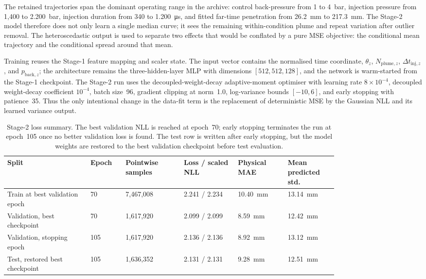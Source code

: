 \documentclass[english, 12pt, a4paper, elec, utf8, a-2b, online]{aaltothesis}
\begin{document}
The retained trajectories span the dominant operating range in the archive: control back-pressure from 1 to \SI{4}{bar}, injection pressure from 1,400 to \SI{2,200}{bar}, injection duration from 340 to \SI{1,200}{\micro s}, and fitted far-time penetration from \SI{26.2}{mm} to \SI{217.3}{mm}. The Stage-2 model therefore does not only learn a single median curve; it sees the remaining within-condition plume and repeat variation after outlier removal. The heteroscedastic output is used to separate two effects that would be conflated by a pure MSE objective: the conditional mean trajectory and the conditional spread around that mean.

Training reuses the Stage-1 feature mapping and scaler state. The input vector contains the normalised time coordinate, \(\theta_z\), \(N_{\mathrm{plume},z}\), \(\Delta t_{\mathrm{inj},z}\), and \(p_{\mathrm{back},z}\); the architecture remains the three-hidden-layer MLP with dimensions $[512,512,128]$, and the network is warm-started from the Stage-1 checkpoint. The Stage-2 run uses the decoupled-weight-decay adaptive-moment optimiser with learning rate \(8\times10^{-4}\), decoupled weight-decay coefficient \(10^{-4}\), batch size~96, gradient clipping at norm~1.0, log-variance bounds \([-10,6]\), and early stopping with patience~35. Thus the only intentional change in the data-fit term is the replacement of deterministic MSE by the Gaussian NLL and its learned variance output.

\begin{table}[t]
\centering
\footnotesize
\setlength{\tabcolsep}{3pt}
\begin{tabular}{|L{0.20\linewidth}|L{0.08\linewidth}|L{0.14\linewidth}|L{0.13\linewidth}|L{0.12\linewidth}|L{0.12\linewidth}|}
\hline
Split & Epoch & Pointwise samples & Loss / scaled NLL & Physical MAE & Mean predicted std. \\
\hline
Train at best validation epoch & 70 & 7{,}467{,}008 & 2.241 / 2.234 & \SI{10.40}{mm} & \SI{13.14}{mm} \\
Validation, best checkpoint & 70 & 1{,}617{,}920 & 2.099 / 2.099 & \SI{8.59}{mm} & \SI{12.42}{mm} \\
Validation, stopping epoch & 105 & 1{,}617{,}920 & 2.136 / 2.136 & \SI{8.92}{mm} & \SI{13.12}{mm} \\
Test, restored best checkpoint & 105 & 1{,}636{,}352 & 2.131 / 2.131 & \SI{9.28}{mm} & \SI{12.51}{mm} \\
\hline
\end{tabular}
\caption{Stage-2 loss summary. The best validation NLL is reached at epoch~70; early stopping terminates the run at epoch~105 once no better validation loss is found. The test row is written after early stopping, but the model weights are restored to the best validation checkpoint before test evaluation.}
\label{tab:stage2-epoch-loss}
\end{table}
\end{document}
